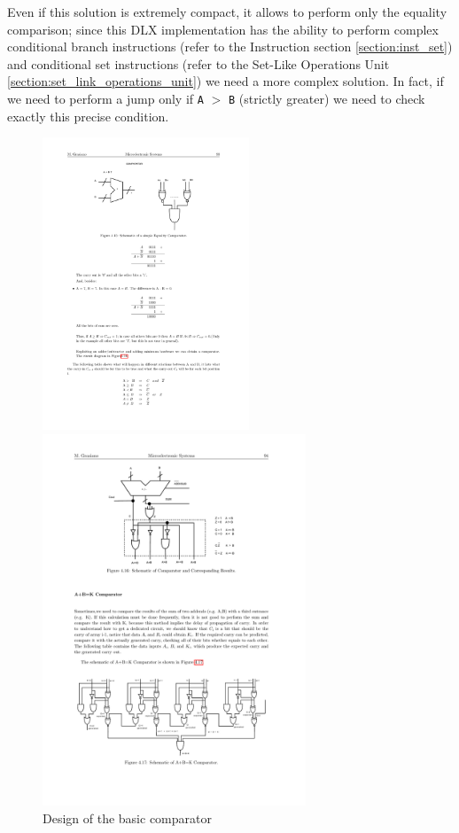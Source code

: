 Even if this solution is extremely compact, it allows to perform only the equality comparison; since this DLX implementation has the ability to perform complex conditional branch instructions (refer to the Instruction section \ref{section:inst_set}) and conditional set instructions (refer to the Set-Like Operations Unit \ref{section:set_link_operations_unit}) we need a more complex solution. In fact, if we need to perform a jump only if \texttt{A} $>$ \texttt{B} (strictly greater) we need to check exactly this precise condition.

\begin{figure}[H]
	\centering
	\begin{minipage}{.5\textwidth}
		\centering
		\includegraphics[width=0.55\textwidth]{chapters/4_DecodeStage/images/comparator_basic.pdf}
		\caption{Design of the basic comparator}
		\label{fig:comparator_basic}
	\end{minipage}%
	\begin{minipage}{.5\textwidth}
		\centering
		\includegraphics[width=0.7\textwidth]{chapters/4_DecodeStage/images/comparator_advanced.pdf}

\end{minipage}
\end{figure}

